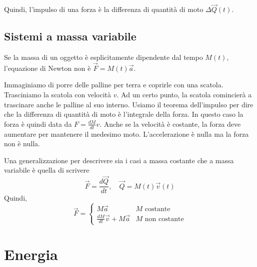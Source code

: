 \documentclass[a4paper]{article}
\begin{document}

Quindi, l'impulso di una forza è la differenza di quantità di moto \(\Delta \vec{Q}(t)\).

\subsection{Sistemi a massa variabile}

Se la massa di un oggetto è esplicitamente dipendente dal tempo \(M(t)\),
l'equazione di Newton non è \(\vec{F} = M(t) \vec{a}\).

Immaginiamo di porre delle palline per terra e coprirle con una scatola.
Trasciniamo la scatola con velocità \(v\). Ad un certo punto, la scatola comincierà a trascinare
anche le palline al suo interno.
Usiamo il teorema dell'impulso per dire che la differenza di quantità di moto è l'integrale
della forza.
In questo caso la forza è quindi data da \(F = \frac{dM}{dt} v\). Anche se la velocità è costante,
la forza deve aumentare per mantenere il medesimo moto.
L'accelerazione è nulla ma la forza non è nulla.

Una generalizzazione per descrivere sia i casi a massa costante che a massa variabile
è quella di scrivere
\[
    \vec{F} = \frac{d\vec{Q}}{dt}, \quad \vec{Q} = M(t)\vec{v}(t)
\]
Quindi,
\[
    \vec{F} = \begin{cases}
        M \vec{a} & M \text{ costante}\\
        \frac{dM}{dt}\vec{v} + M\vec{a} & M \text{ non costante}
    \end{cases}
\]


\pagebreak

\section{Energia}

%
%
\end{document}
